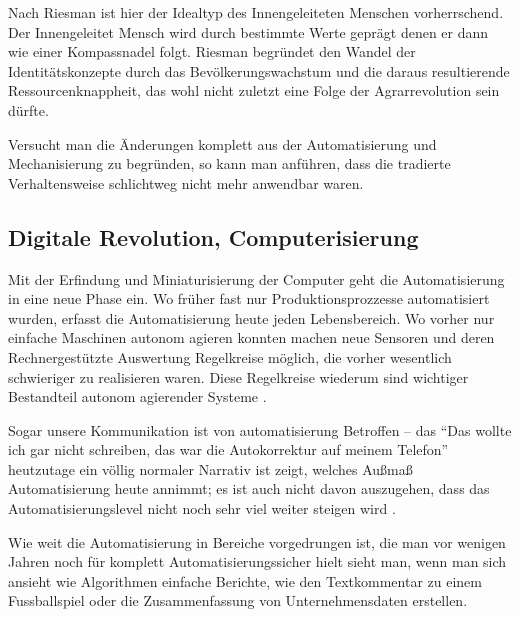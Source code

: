 Nach Riesman ist hier der Idealtyp des Innengeleiteten Menschen vorherrschend. Der Innengeleitet Mensch wird durch bestimmte Werte geprägt denen er dann wie einer Kompassnadel folgt.
Riesman begründet den Wandel der Identitätskonzepte durch das Bevölkerungswachstum und die daraus resultierende Ressourcenknappheit, das wohl nicht zuletzt eine Folge der Agrarrevolution sein dürfte.

Versucht man die Änderungen komplett aus der Automatisierung und Mechanisierung zu begründen, so kann man anführen, dass die tradierte Verhaltensweise schlichtweg nicht mehr anwendbar waren. 




\subsection {Digitale Revolution, Computerisierung}
Mit der Erfindung und Miniaturisierung der Computer geht die Automatisierung in eine neue Phase ein. Wo früher fast nur Produktionsprozzesse automatisiert wurden, erfasst die Automatisierung heute jeden Lebensbereich.
Wo vorher nur einfache Maschinen autonom agieren konnten machen neue Sensoren und deren Rechnergestützte Auswertung Regelkreise möglich, die vorher wesentlich schwieriger zu realisieren waren.
Diese Regelkreise wiederum sind wichtiger Bestandteil autonom agierender Systeme \parencite{ulrich}.

Sogar unsere Kommunikation ist von automatisierung Betroffen – das \enquote{Das wollte ich gar nicht schreiben, das war die Autokorrektur auf meinem Telefon} heutzutage ein völlig normaler Narrativ ist zeigt, welches Außmaß Automatisierung heute annimmt; es ist auch nicht davon auszugehen, dass das Automatisierungslevel nicht noch sehr viel weiter steigen wird \parencite{arbeitsfrei}.

Wie weit die Automatisierung in Bereiche vorgedrungen ist, die man vor wenigen Jahren noch für komplett Automatisierungssicher hielt sieht man, wenn man sich ansieht wie Algorithmen einfache Berichte, wie den Textkommentar zu einem Fussballspiel oder die Zusammenfassung von Unternehmensdaten erstellen.
